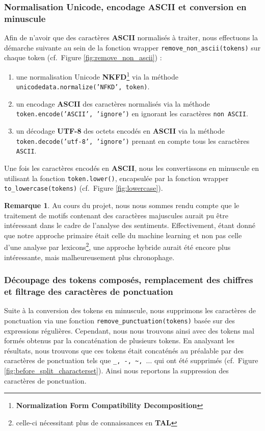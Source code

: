 \documentclass[12pt,a4paper]{report}
\theoremstyle{definition}
\newtheorem*{remark}{Remarque}
\begin{document}
\subsubsection{Normalisation Unicode, encodage ASCII et conversion en minuscule}
Afin de n'avoir que des caractères \textbf{ASCII} normalisés à traiter, nous effectuons la démarche suivante au sein de la fonction wrapper \texttt{remove\_non\_ascii(tokens)} sur chaque token (cf.~Figure \ref{fig:remove_non_ascii}) :
\begin{enumerate}
  \item une normalisation Unicode \textbf{NKFD}\footnote{\textbf{Normalization Form Compatibility Decomposition}} via la méthode \texttt{unicodedata.normalize('NFKD', token)}.
  \item un encodage \textbf{ASCII} des caractères normalisés via la méthode \texttt{token.encode('ASCII', 'ignore')} en ignorant les caractères \texttt{non ASCII}.
  \item un décodage \textbf{UTF-8} des octets encodés en \textbf{ASCII} via la méthode \texttt{token.decode('utf-8', 'ignore')} prenant en compte tous les caractères \texttt{ASCII}.
\end{enumerate}

Une fois les caractères encodés en \textbf{ASCII}, nous les convertissons en minuscule en utilisant la fonction \texttt{token.lower()}, encapsulée par la fonction wrapper \texttt{to\_lowercase(tokens)} (cf.~Figure \ref{fig:lowercase}).

\begin{remark}
  Au cours du projet, nous nous sommes rendu compte que le traitement de motifs contenant des caractères majuscules aurait pu être intéressant dans le cadre de l'analyse des sentiments. Effectivement, étant donné que notre approche primaire était celle du machine learning et non pas celle d'une analyse par lexicons\footnote{celle-ci nécessitant plus de connaissances en \textbf{TAL}}, une approche hybride aurait été encore plus intéressante, mais malheureusement plus chronophage.
\end{remark}

\subsubsection{Découpage des tokens composés, remplacement des chiffres et filtrage des caractères de ponctuation}
Suite à la conversion des tokens en minuscule, nous supprimons les caractères de ponctuation via une fonction \texttt{remove\_punctuation(tokens)} basée sur des expressions régulières. Cependant, nous nous trouvons ainsi avec des tokens mal formés obtenus par la concaténation de plusieurs tokens. En analysant les résultats, nous trouvons que ces tokens était concaténés au préalable par des caractères de ponctuation tels que \texttt{\_, -, \textasciitilde, $\dots$} qui ont été supprimés (cf.~Figure \ref{fig:before_split_characterset}). Ainsi nous reportons la suppression des caractères de ponctuation.
\end{document}

